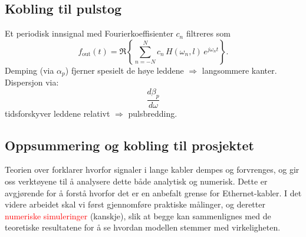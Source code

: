 \subsection{Kobling til pulstog}
Et periodisk innsignal med Fourierkoeffisienter \(c_n\) filtreres som
\[
f_{\text{out}}(t)=\Re\!\left\{\sum_{n=-N}^{N} c_n\,H(\omega_n,l)\,e^{j\omega_n t}\right\}.
\]
Demping (via \(\alpha_p\)) fjerner spesielt de høye leddene \(\Rightarrow\) langsommere kanter.\\
Dispersjon via: 
\[\frac{d\beta_p}{d\omega}\] 
tidsforskyver leddene relativt \(\Rightarrow\) pulsbredding.


\subsection{Oppsummering og kobling til prosjektet}

Teorien over forklarer hvorfor signaler i lange kabler dempes og forvrenges, og gir oss verktøyene til å analysere dette både analytisk og numerisk. Dette er avgjørende for å forstå hvorfor det er en anbefalt grense for Ethernet-kabler. I det videre arbeidet skal vi først gjennomføre praktiske målinger, og deretter \textcolor{red}{numeriske simuleringer} (kanskje), slik at begge kan sammenlignes med de teoretiske resultatene for å se hvordan modellen stemmer med virkeligheten.
